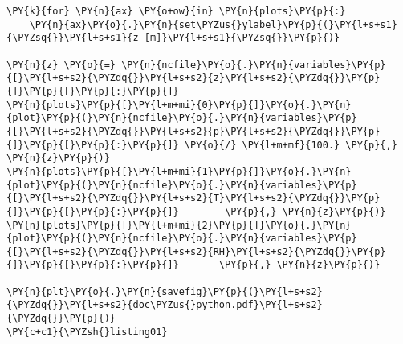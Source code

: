 \begin{Verbatim}[commandchars=\\\{\}]
\PY{k}{for} \PY{n}{ax} \PY{o+ow}{in} \PY{n}{plots}\PY{p}{:}
    \PY{n}{ax}\PY{o}{.}\PY{n}{set\PYZus{}ylabel}\PY{p}{(}\PY{l+s+s1}{\PYZsq{}}\PY{l+s+s1}{z [m]}\PY{l+s+s1}{\PYZsq{}}\PY{p}{)}

\PY{n}{z} \PY{o}{=} \PY{n}{ncfile}\PY{o}{.}\PY{n}{variables}\PY{p}{[}\PY{l+s+s2}{\PYZdq{}}\PY{l+s+s2}{z}\PY{l+s+s2}{\PYZdq{}}\PY{p}{]}\PY{p}{[}\PY{p}{:}\PY{p}{]}
\PY{n}{plots}\PY{p}{[}\PY{l+m+mi}{0}\PY{p}{]}\PY{o}{.}\PY{n}{plot}\PY{p}{(}\PY{n}{ncfile}\PY{o}{.}\PY{n}{variables}\PY{p}{[}\PY{l+s+s2}{\PYZdq{}}\PY{l+s+s2}{p}\PY{l+s+s2}{\PYZdq{}}\PY{p}{]}\PY{p}{[}\PY{p}{:}\PY{p}{]} \PY{o}{/} \PY{l+m+mf}{100.} \PY{p}{,} \PY{n}{z}\PY{p}{)}
\PY{n}{plots}\PY{p}{[}\PY{l+m+mi}{1}\PY{p}{]}\PY{o}{.}\PY{n}{plot}\PY{p}{(}\PY{n}{ncfile}\PY{o}{.}\PY{n}{variables}\PY{p}{[}\PY{l+s+s2}{\PYZdq{}}\PY{l+s+s2}{T}\PY{l+s+s2}{\PYZdq{}}\PY{p}{]}\PY{p}{[}\PY{p}{:}\PY{p}{]}        \PY{p}{,} \PY{n}{z}\PY{p}{)}
\PY{n}{plots}\PY{p}{[}\PY{l+m+mi}{2}\PY{p}{]}\PY{o}{.}\PY{n}{plot}\PY{p}{(}\PY{n}{ncfile}\PY{o}{.}\PY{n}{variables}\PY{p}{[}\PY{l+s+s2}{\PYZdq{}}\PY{l+s+s2}{RH}\PY{l+s+s2}{\PYZdq{}}\PY{p}{]}\PY{p}{[}\PY{p}{:}\PY{p}{]}       \PY{p}{,} \PY{n}{z}\PY{p}{)} 
   
\PY{n}{plt}\PY{o}{.}\PY{n}{savefig}\PY{p}{(}\PY{l+s+s2}{\PYZdq{}}\PY{l+s+s2}{doc\PYZus{}python.pdf}\PY{l+s+s2}{\PYZdq{}}\PY{p}{)}
\PY{c+c1}{\PYZsh{}listing01}
\end{Verbatim}
